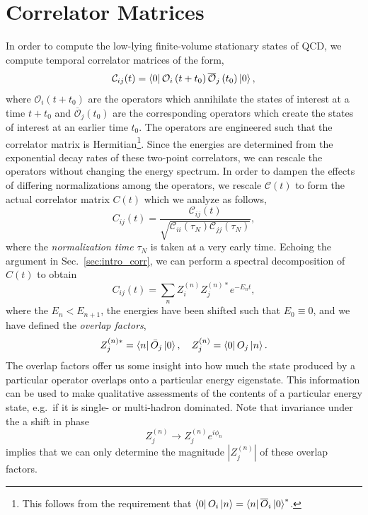 \section{Correlator Matrices}\label{sec:correlator_matrices}
In order to compute the low-lying finite-volume stationary states of QCD, we compute temporal correlator matrices of the form,
\begin{equation}
    \mathcal{C}_{i j}(t)=\bra 0 \mathcal O_{i}\left(t+t_{0}\right) \overline{\mathcal O}_{j}\left(t_{0}\right)\ket 0,
\end{equation}
where $\mathcal O_i(t+t_0)$ are the operators which annihilate the states of interest at a time $t+t_0$ and $\overline{\mathcal O}_j(t_0)$ are the corresponding operators which create the states of interest at an earlier time $t_0$. The operators are engineered such that the correlator matrix is Hermitian\footnote{This follows from the requirement that $\bra 0 O_i \ket n = \bra n \overline O_i \ket 0 ^*$.}. Since the energies are determined from the exponential decay rates of these two-point correlators, we can rescale the operators without changing the energy spectrum. In order to dampen the effects of differing normalizations among the operators, we rescale $\mathcal C(t)$ to form the actual correlator matrix $C(t)$ which we analyze as follows,
\begin{equation}
    C_{ij}(t) = \frac{\mathcal C_{ij}(t)}{\sqrt{\mathcal C_{ii}(\tau_N) \mathcal C_{jj}(\tau_N)}},
\end{equation}
where the \emph{normalization time} $\tau_N$ is taken at a very early time. Echoing the argument in Sec.~\ref{sec:intro_corr}, we can perform a spectral decomposition of $C(t)$ to obtain
\begin{equation}\label{eq:corr_spec_decomp}
    C_{i j}(t)=\sum_{n} Z_{i}^{(n)} Z_{j}^{(n) *} e^{-E_{n} t},
\end{equation}
where the $E_n < E_{n+1}$, the energies have been shifted such that $E_0\equiv 0$, and we have defined the \emph{overlap factors},
\begin{equation}
    Z_{j}^{(n) *}=\bra n \bar{O}_{j}\ket 0, \quad Z_{j}^{(n)}=\bra 0 O_{j} \ket n.
\end{equation}
The overlap factors offer us some insight into how much the state produced by a particular operator overlaps onto a particular energy eigenstate. This information can be used to make qualitative assessments of the contents of a particular energy state, e.g.\ if it is single- or multi-hadron dominated. Note that invariance under the a shift in phase
\begin{equation}
    Z_{j}^{(n)} \rightarrow Z_{j}^{(n)} e^{i \phi_{n}}
\end{equation}
implies that we can only determine the magnitude $|Z_j^{(n)}|$ of these overlap factors.
